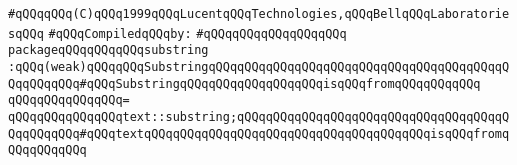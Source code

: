 \label{src/lib/std/substring.pkg}
\verb|#qQQqqQQq(C)qQQq1999qQQqLucentqQQqTechnologies,qQQqBellqQQqLaboratoriesqQQq|\newline
\newline
\verb|#qQQqCompiledqQQqby:|\newline
\verb|#qQQqqQQqqQQqqQQqqQQq|\newline
\newline
\verb|packageqQQqqQQqqQQqsubstring|\newline
\verb|:qQQq(weak)qQQqqQQqSubstringqQQqqQQqqQQqqQQqqQQqqQQqqQQqqQQqqQQqqQQqqQQqqQQqqQQq#qQQqSubstringqQQqqQQqqQQqqQQqqQQqisqQQqfromqQQqqQQqqQQq|\newline
\verb|qQQqqQQqqQQqqQQq=|\newline
\verb|qQQqqQQqqQQqqQQqtext::substring;qQQqqQQqqQQqqQQqqQQqqQQqqQQqqQQqqQQqqQQqqQQqqQQq#qQQqtextqQQqqQQqqQQqqQQqqQQqqQQqqQQqqQQqqQQqqQQqisqQQqfromqQQqqQQqqQQq|\newline

